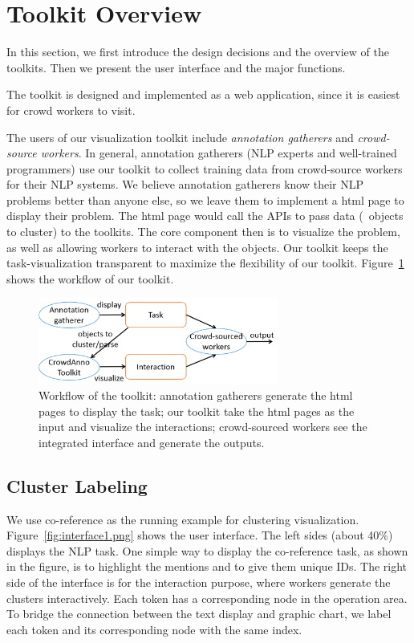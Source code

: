 \section{Toolkit Overview}

In this section, we first introduce the design decisions and the
overview of the toolkits. Then we present the user interface and the
major functions.

The toolkit is designed and implemented as a web application, since it
is easiest for crowd workers to visit.

The users of our visualization toolkit include {\em annotation
gatherers} and {\em crowd-source workers}. In general, annotation
gatherers (NLP experts and well-trained programmers) use our toolkit
to collect training data from crowd-source workers for their NLP
systems. We believe annotation gatherers know their NLP problems
better than anyone else, so we leave them to implement a html page to
display their problem. The html page would call the APIs to pass data
(\eg\ objects to cluster) to the toolkits. The core component then is
to visualize the problem, as well as allowing workers to interact with
the objects. Our toolkit keeps the task-visualization transparent to
maximize the flexibility of our toolkit. Figure~\ref{fig:workflow}
shows the workflow of our toolkit.

\begin{figure}
\centering
\includegraphics[width=3.1in]{figs/workflow.png}
\caption{Workflow of the toolkit: annotation gatherers generate the
html pages to display the task; our toolkit take the html pages as the
input and visualize the interactions; crowd-sourced workers see the
integrated interface and generate the outputs. }
\label{fig:workflow}
\end{figure}

\subsection{Cluster Labeling}

We use co-reference as the running example for clustering
visualization. Figure~\ref{fig:interface1.png} shows the user
interface. The left sides (about 40\%) displays the NLP task. One simple way to
display the co-reference task, as shown in the figure, is to highlight
the mentions and to give them unique IDs. The right side of the
interface is for the interaction purpose, where workers generate the
clusters interactively. Each token has a corresponding node in the operation area. 
To bridge the connection between the text display and graphic chart, we label each token and its corresponding 
node with the same index. 

